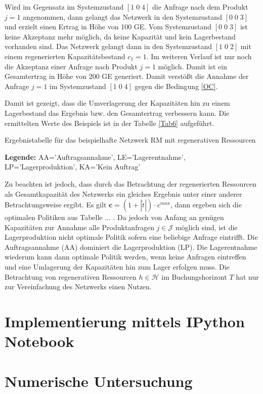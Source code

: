 Wird im Gegensatz im Systemzustand $[1\;0\;4]$ die Anfrage nach dem Produkt $j=1$ angenommen, dann gelangt das Netzwerk in den Systemzustand $[0\;0\;3]$ und erzielt einen Ertrag in Höhe von 100 GE. Vom Systemzustand $[0\;0\;3]$ ist keine Akzeptanz mehr möglich, da keine Kapazität und kein Lagerbestand vorhanden sind. Das Netzwerk gelangt dann in den Systemzustand $[1\;0\;2]$ mit einem regenerierten Kapazitätsbestand $c_1=1$. Im weiteren Verlauf ist nur noch die Akzeptanz einer Anfrage nach Produkt $j=1$ möglich. Damit ist ein Gesamtertrag in Höhe von 200 GE generiert. Damit verstößt die Annahme der Anfrage $j=1$ im Systemzustand $[1\;0\;4]$ gegen die Bedingung \eqref{OC}.

Damit ist gezeigt, dass die Umverlagerung der Kapazitäten hin zu einem Lagerbestand das Ergebnis bzw. den Gesamtertrag verbessern kann. Die ermittelten Werte des Beispiels ist in der Tabelle \ref{Tab6} aufgeführt.

\begin{table}
\begin{footnotesize}
    \caption{Ergebnistabelle für das beispielhafte Netzwerk RM mit regenerativen Ressourcen} \label{Tab6}
    \vspace*{3mm}
    \begin{center}
      {\footnotesize \textbf{Legende:} AA='Auftragsannahme', LE='Lagerentnahme', LP='Lagerproduktion', KA='Kein Auftrag'} 
      \end{center}
\end{footnotesize}
\end{table}

Zu beachten ist jedoch, dass durch das Betrachtung der regenerierten Ressourcen als Gesamtkapazität des Netzwerks ein gleiches Ergebnis unter einer anderer Betrachtungsweise ergibt. Es gilt $\textbf{c}=(1+|\tilde{t}|)\cdot c^{max}$, dann ergeben sich die optimalen Politiken aus Tabelle ... . Da jedoch von Anfang an genügen Kapazitäten zur Annahme alle Produktanfragen $j\in\mathcal{J}$ möglich sind, ist die Lagerproduktion nicht optimale Politik sofern eine beliebige Anfrage eintrifft. Die Auftragsannahme (AA) dominiert die Lagerproduktion (LP). Die Lagerentnahme wiederum kann dann optimale Politik werden, wenn keine Anfragen eintreffen und eine Umlagerung der Kapazitäten hin zum Lager erfolgen muss. Die Betrachtung von regenerativen Ressourcen $h\in\mathcal{H}$ im Buchungshorizont $T$ hat nur zur Vereinfachung des Netzwerks einen Nutzen.

\section{Implementierung mittels IPython Notebook}

\section{Numerische Untersuchung}